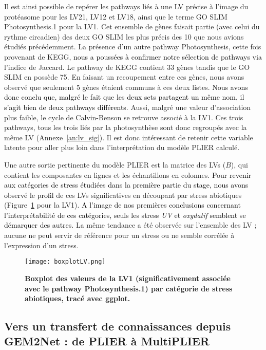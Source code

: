 \documentclass[twoside]{article}
\newcommand{\AR}[1]{\textcolor{black}{#1}}
\begin{document}
\newpage
Il est ainsi possible de repérer les pathways liés à une LV précise à l'image du protéasome pour les LV21, LV12 et LV18, ainsi que le terme GO SLIM Photosynthesis.1 pour la LV1. Cet ensemble de gènes faisait partie (avec celui du rythme circadien) des deux GO SLIM les plus précis des 10 que nous avions étudiés précédemment. La présence d'un autre pathway Photosynthesis, cette fois provenant de KEGG, \AR{nous a poussées à confirmer notre sélection de pathways via} l'indice de Jaccard. Le pathway de KEGG contient 33 gènes tandis que le GO SLIM en possède 75. En faisant un recoupement entre ces gènes, nous avons observé que seulement 5 gènes étaient communs à ces deux listes. \AR{Nous avons donc conclu que, malgré le fait que les deux sets partagent un même nom, il s'agit bien de deux pathways différents.} Aussi, malgré une valeur d'association plus faible, le cycle de Calvin-Benson se retrouve associé à la LV1. Ces trois pathways, tous les trois liés par la photosynthèse sont donc regroupés avec la même LV (Annexe~\ref{an:lv_sig}). Il est donc intéressant de retenir cette variable latente pour aller plus loin dans l'interprétation du modèle PLIER calculé.

\vspace{0.5cm}Une autre sortie pertinente du modèle PLIER est la matrice des LVs ($B$), qui contient les composantes en lignes et les échantillons en colonnes. \AR{Pour revenir aux catégories de stress étudiées dans la première partie du stage, nous avons observé le profil} de ces LVs significatives en découpant par stress abiotiques (Figure~\ref{fig:lvbox} pour la LV1). \AR{A l'image de nos premières conclusions concernant l'interprétabilité de ces catégories, seuls les stress \textit{UV} et \textit{oxydatif} semblent se démarquer des autres.} La même tendance a été observée sur l'ensemble des LV ; aucune ne peut servir de référence pour un stress ou ne semble corrélée à l'expression d'un stress.

    \begin{figure}[!h]
    \centering
        \texttt{[image: boxplotLV.png]}
        \caption[Valeurs de la LV1 par catégorie de stress abiotique]{\textbf{Boxplot des valeurs de la LV1 (significativement associée avec le pathway Photosynthesis.1) par catégorie de stress abiotiques,
        tracé avec ggplot.\label{fig:lvbox}}}
    \end{figure}
    

    \subsection{Vers un transfert de connaissances depuis GEM2Net : de PLIER à MultiPLIER}
 
\end{document}
